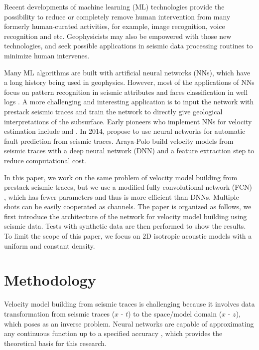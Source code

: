 \documentclass{segabs}
\begin{document}
Recent developments of machine learning (ML) technologies provide the possibility to reduce or completely remove human intervention from many formerly human-curated activities, for example, image recognition, voice recognition and etc. Geophysicists may also be empowered with those new technologies, and seek possible applications in seismic data processing routines to minimize human intervenes.

Many ML algorithms are built with artificial neural networks (NNs), which have a long history being used in geophysics. However, most of the applications of NNs focus on pattern recognition in seismic attributes  \citep{zeng04,zhao15} and faces classification in well logs \citep{lim05,hall16}. A more challenging and interesting application is to input the network with prestack seismic traces and train the network to directly give geological interpretations of the subsurface. Early pioneers who implement NNs for velocity estimation include \citet{roth94} and \citet{nath99}.
In 2014, \citet{zhang14} propose to use neural networks for automatic fault prediction from seismic traces. Araya-Polo \citet{araya18} build velocity models from seismic traces with a deep neural network (DNN) and a feature extraction step to reduce computational cost. 

In this paper, we work on the same problem of velocity model building from prestack seismic traces, but we use a modified fully convolutional network (FCN) \citep{long15}, which has fewer parameters and thus is more efficient than DNNs. Multiple shots can be easily cooperated as channels. 
The paper is organized as follows, we first introduce the architecture of the network for velocity model building using seismic data. Tests with synthetic data are then performed to show the results. To limit the scope of this paper, we focus on 2D isotropic acoustic models with a uniform and constant density.


\section{Methodology}

Velocity model building from seismic traces is challenging because it involves data transformation from seismic traces ($x$ - $t$) to the space/model domain ($x$ - $z$), which poses as an inverse problem. Neural networks are capable of approximating any continuous function up to a specified accuracy \citep{hornik89}, which provides the theoretical basis for this research.
\end{document}
